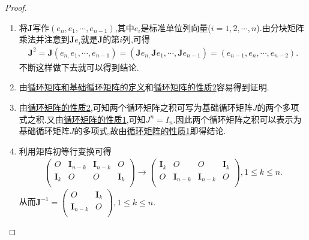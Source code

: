 \documentclass[lang=cn,newtx,10pt,scheme=chinese]{elegantbook}
\begin{document}
\begin{proof}
\begin{enumerate}
    \item 将$\boldsymbol{J}$写作$(e_n,e_1,\cdots,e_{n-1})$,其中$e_i$是标准单位列向量($i=1,2,\cdots,n$).由分块矩阵乘法并注意到$\boldsymbol{J}e_i$就是$\boldsymbol{J}$的第$i$列,可得
    \begin{align*}
        \boldsymbol{J}^2=\boldsymbol{J}\left( e_{n,}e_1,\cdots ,e_{n-1} \right) =\left( \boldsymbol{J}e_{n,}\boldsymbol{J}e_1,\cdots ,\boldsymbol{J}e_{n-1} \right) =\left( e_{n-1},e_n,\cdots ,e_{n-2} \right) .
    \end{align*}
不断这样做下去就可以得到结论.
    \item 由\hyperref[definition:循环矩阵]{循环矩阵和基础循环矩阵的定义}和\hyperref[proposition:循环矩阵的性质]{循环矩阵的性质2}容易得到证明.
    \item 由\hyperref[proposition:循环矩阵的性质]{循环矩阵的性质2},可知两个循环矩阵之积可写为基础循环矩阵$J$的两个多项式之积.又由\hyperref[proposition:循环矩阵的性质]{循环矩阵的性质1},可知$J^n=I_n$.因此两个循环矩阵之积可以表示为基础循环矩阵$J$的多项式,故由\hyperref[proposition:循环矩阵的性质]{循环矩阵的性质1}即得结论.
    \item 利用矩阵初等行变换可得
    \begin{align*}
        \left( \begin{matrix}
            O&		\boldsymbol{I}_{n-k}&		\boldsymbol{I}_{n-k}&		O\\
            \boldsymbol{I}_k&		O&		O&		\boldsymbol{I}_k\\
        \end{matrix} \right) \rightarrow \left( \begin{matrix}
            \boldsymbol{I}_k&		O&		O&		\boldsymbol{I}_k\\
            O&		\boldsymbol{I}_{n-k}&		\boldsymbol{I}_{n-k}&		O\\
        \end{matrix} \right) ,1\le k\le n.
    \end{align*}
从而$\boldsymbol{J}^{-1}=\left( \begin{matrix}
	O&		\boldsymbol{I}_k\\
	\boldsymbol{I}_{n-k}&		O\\
\end{matrix} \right) ,1\le k\le n.$
\end{enumerate}
\end{proof}
\end{document}
